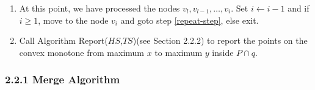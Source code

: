\documentclass[runningheads,a4paper]{llncs}
\begin{document}
\begin{enumerate}
{\em for} $j\leftarrow 1$ to $m$ call Algorithm Merge($ch_{w(i,j)}$,$HS$,$TS$) (see Section 2.2.1).\\

\item\label{primarytree}
At this point, we have processed the nodes {$ v_{l}, v_{l-1},\ldots,v_{i} $}. 
Set $i \leftarrow i-1$ and if $i \geq 1$, move to the node $v_{i}$ and
goto step \ref{repeat-step}, else exit.

\item
Call Algorithm Report($HS$,$TS$)(see Section 2.2.2) to report the points on the convex monotone from 
maximum $x$ to maximum $y$ inside $P \cap q$.\end{enumerate}
\subsubsection{2.2.1  Merge Algorithm}\label{merge-al}
\end{document}

